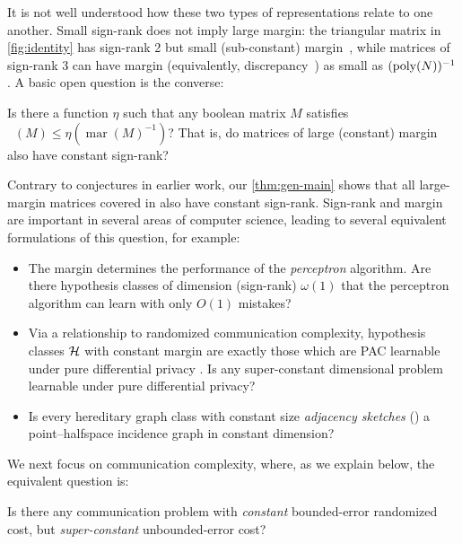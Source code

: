 \documentclass{article}
\DeclareMathOperator{\signrank}{rank_\pm}
\DeclareMathOperator{\margin}{\mathrm{mar}}
\begin{document}
It is not well understood how these two types of representations relate to
one another. Small sign-rank does not imply large margin: the triangular matrix in \cref{fig:identity} has sign-rank 2 but small (sub-constant)
margin~\cite{BW16,Vio15,SA23}, while matrices of sign-rank 3 can have margin
(equivalently, discrepancy~\cite{LS09}) as small as $(\operatorname{poly}(N))^{-1}$
\cite{HHL20,ACHS24}. A basic open question is the converse:
\begin{boxquestion}
\label{question:intro-main}
Is there a function $\eta$ such that any boolean matrix $M$ satisfies $\signrank(M) \leq \eta(\margin(M)^{-1})$? That is, do matrices of large (constant) margin also have constant sign-rank?
\end{boxquestion}
Contrary to conjectures in earlier work, our \cref{thm:gen-main} shows that all large-margin
matrices covered in \cite{FGHH25} also have constant sign-rank. Sign-rank and margin are important in
several areas of computer science, leading to several equivalent formulations of
this question, for example:
\begin{itemize}[itemsep=0pt]
\item The margin determines the performance of the \emph{perceptron} algorithm. Are there hypothesis
classes of dimension (sign-rank) $\omega(1)$ that the perceptron algorithm can learn with only
$O(1)$ mistakes?
\item Via a relationship to randomized communication complexity, hypothesis classes $\mathcal{H}$ with
constant margin are exactly those which are PAC learnable under pure differential privacy \cite{FX14,BNS19}.  Is any
super-constant dimensional problem learnable under pure differential privacy?
\item Is every hereditary graph class with constant size \emph{adjacency sketches}
(\eg \cite{FK09,Har20,HWZ22,EHK22,NP24,AN25}) a point--halfspace incidence graph in constant dimension?
\end{itemize}
We next focus on communication complexity, where, as we explain below, the equivalent question is:
\begin{boxquestion}
Is there any communication problem with \emph{constant} bounded-error randomized cost, but
\emph{super-constant} unbounded-error cost?
\end{boxquestion}
\end{document}
